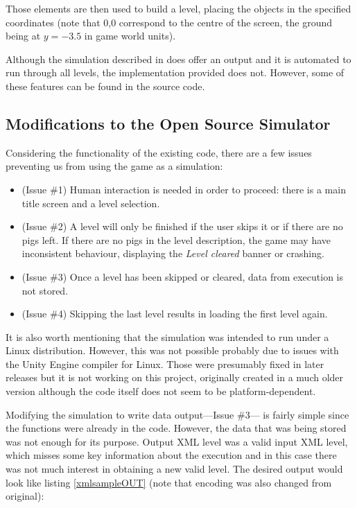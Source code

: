 Those elements are then used to build a level, placing the objects in the specified coordinates (note that 0,0 correspond to the centre of the screen, the ground being at $y=-3.5$ in game world units).

Although the simulation described in \cite{ferreira2014search} does offer an output and it is automated to run through all levels, the implementation provided does not. However, some of these features can be found in the source code.

\subsection{Modifications to the Open Source Simulator}\label{ch:gameApdaptation}
Considering the functionality of the existing code, there are a few issues preventing us from using the game as a simulation:

\begin{itemize}
	\item (Issue \#1) Human interaction is needed in order to proceed: there is a main title screen and a level selection. 
	\item (Issue \#2) A level will only be finished if the user skips it or if there are no pigs left. If there are no pigs in the level description, the game may have inconsistent behaviour, displaying the \textit{Level cleared} banner or crashing.
	\item (Issue \#3) Once a level has been skipped or cleared, data from execution is not stored.
	\item (Issue \#4) Skipping the last level results in loading the first level again. 
\end{itemize}

It is also worth mentioning that the simulation was intended to run under a Linux distribution. However, this was not possible probably due to issues with the Unity Engine compiler for Linux. Those were presumably fixed in later releases but it is not working on this project, originally created in a much older version although the code itself does not seem to be platform-dependent.

Modifying the simulation to write data output---Issue \#3--- is fairly simple since the functions were already in the code. However, the data that was being stored was not enough for its purpose. Output XML level was a valid input XML level, which misses some key information about the execution and in this case there was not much interest in obtaining a new valid level. The desired output would look like listing \ref{xmlsampleOUT} (note that encoding was also changed from original): 
 

